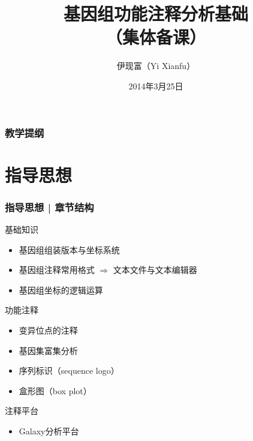 \documentclass[table]{beamer}
\begin{document}

\title[基因组功能注释分析基础]{基因组功能注释分析基础\\ （集体备课）}
\author[Yixf]{伊现富（Yi Xianfu）}
\date{2014年3月25日}



\begin{frame}
  \titlepage
\end{frame}

\begin{frame}[plain]
  \frametitle{教学提纲}
  \setcounter{tocdepth}{2}
  \begin{multicols}{2}
  \tableofcontents
  \end{multicols}
\end{frame}

\section{指导思想}
\begin{frame}
  \frametitle{指导思想 | 章节结构}
  \begin{alertblock}{基础知识}
    \begin{itemize}
      \item 基因组组装版本与坐标系统
      \item 基因组注释常用格式 $\Longrightarrow$ 文本文件与文本编辑器
      \item 基因组坐标的逻辑运算
    \end{itemize}
  \end{alertblock}
  \pause
  \begin{block}{功能注释}
    \begin{itemize}
      \item 变异位点的注释
      \item 基因集富集分析
      \item 序列标识（sequence logo）
      \item 盒形图（box plot）
    \end{itemize}
  \end{block}
  \pause
  \begin{alertblock}{注释平台}
    \begin{itemize}
      \item Galaxy分析平台
    \end{itemize}
  \end{alertblock}
\end{frame}
\end{document}
